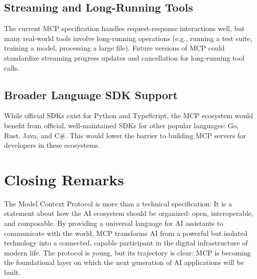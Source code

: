 \subsection{Streaming and Long-Running Tools}
The current MCP specification handles request-response interactions well, but many real-world tools involve long-running operations (e.g., running a test suite, training a model, processing a large file). Future versions of MCP could standardize streaming progress updates and cancellation for long-running tool calls.

\subsection{Broader Language SDK Support}
While official SDKs exist for Python and TypeScript, the MCP ecosystem would benefit from official, well-maintained SDKs for other popular languages: Go, Rust, Java, and C\#. This would lower the barrier to building MCP servers for developers in these ecosystems.

\section{Closing Remarks}
The Model Context Protocol is more than a technical specification. It is a statement about how the AI ecosystem should be organized: open, interoperable, and composable. By providing a universal language for AI assistants to communicate with the world, MCP transforms AI from a powerful but isolated technology into a connected, capable participant in the digital infrastructure of modern life. The protocol is young, but its trajectory is clear: MCP is becoming the foundational layer on which the next generation of AI applications will be built.
